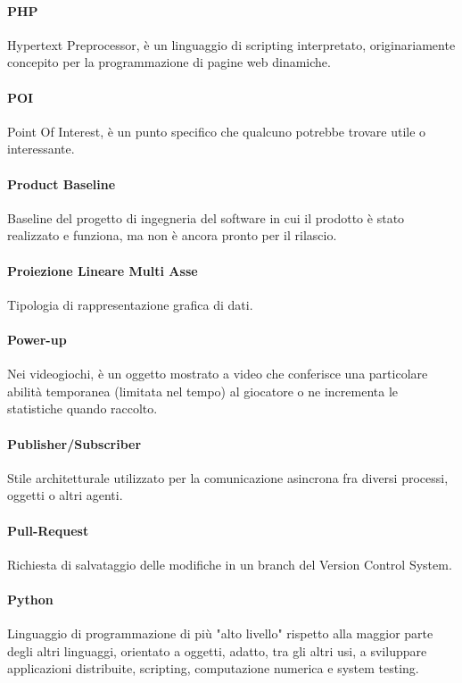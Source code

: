 \documentclass[]{article}
\begin{document}
	\paragraph*{PHP}
	Hypertext Preprocessor, è un linguaggio di scripting interpretato, originariamente concepito per la programmazione di pagine web dinamiche.
	
	\paragraph*{POI}
	Point Of Interest, è un punto specifico che qualcuno potrebbe trovare utile o interessante.
	
	\paragraph*{Product Baseline}
	Baseline del progetto di ingegneria del software in cui il prodotto è stato realizzato e funziona, ma non è ancora pronto per il rilascio.
	
	\paragraph*{Proiezione Lineare Multi Asse}
	Tipologia di rappresentazione grafica di dati.
	
	\paragraph*{Power-up}
	Nei videogiochi, è un oggetto mostrato a video che conferisce una particolare abilità temporanea (limitata nel tempo) al giocatore o ne incrementa le statistiche quando raccolto.
	
	\paragraph*{Publisher/Subscriber}
	Stile architetturale utilizzato per la comunicazione asincrona fra diversi processi, oggetti o altri agenti.
	
	\paragraph*{Pull-Request}
	Richiesta di salvataggio delle modifiche in un branch del Version Control System.
	
	\paragraph*{Python}
	Linguaggio di programmazione di più "alto livello" rispetto alla maggior parte degli altri linguaggi, orientato a oggetti, adatto, tra gli altri usi, a sviluppare applicazioni distribuite, scripting, computazione numerica e system testing.
	
\end{document}
